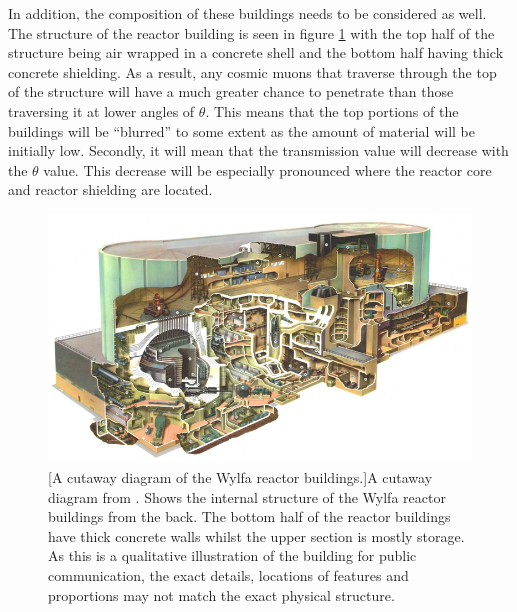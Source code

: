 

In addition, the composition of these buildings needs to be considered as well. The structure of the reactor building is seen in figure \ref{fig:wylfaReactorRoughStructure} with the top half of the structure being air wrapped in a concrete shell and the bottom half having thick concrete shielding. As a result, any cosmic muons that traverse through the top of the structure will have a much greater chance to penetrate than those traversing it at lower angles of $\theta$. This means that the top portions of the buildings will be ``blurred'' to some extent as the amount of material will be initially low. Secondly, it will mean that the transmission value will decrease with the $\theta$ value. This decrease will be especially pronounced where the reactor core and reactor shielding are located. 

\begin{figure}[!h]
 \centering
 \includegraphics[width=0.7\linewidth]{Chapter5/Figs/wylfaRasterNew/wylfaReactorRoughStructure.png}
 [A cutaway diagram of the Wylfa reactor buildings.]{A cutaway diagram from \cite{neiMag_1965}. Shows the internal structure of the Wylfa reactor buildings from the back. The bottom half of the reactor buildings have thick concrete walls whilst the upper section is mostly storage. As this is a qualitative illustration of the building for public communication, the exact details, locations of features and proportions may not match the exact physical structure.} 
 \label{fig:wylfaReactorRoughStructure}
\end{figure}

